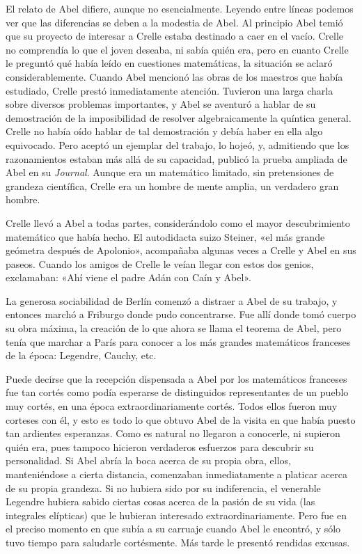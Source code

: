 \documentclass[a4paper, 12pt, draft]{article}
\begin{document}
El relato de Abel difiere, aunque no esencialmente. Leyendo entre líneas podemos ver que las diferencias se deben a la modestia de Abel. Al principio Abel temió que su proyecto de interesar a Crelle estaba destinado a caer en el vacío. Crelle no comprendía lo que el joven deseaba, ni sabía quién era, pero en cuanto Crelle le preguntó qué había leído en cuestiones matemáticas, la situación se aclaró considerablemente. Cuando Abel mencionó las obras de los maestros que había estudiado, Crelle prestó inmediatamente atención. Tuvieron una larga charla sobre diversos problemas importantes, y Abel se aventuró a hablar de su demostración de la imposibilidad de resolver algebraicamente la quíntica general. Crelle no había oído hablar de tal demostración y debía haber en ella algo equivocado. Pero aceptó un ejemplar del trabajo, lo hojeó, y, admitiendo que los razonamientos estaban más allá de su capacidad, publicó la prueba ampliada de Abel en su {\it Journal}. Aunque era un matemático limitado, sin pretensiones de grandeza científica, Crelle era un hombre de mente amplia, un verdadero gran hombre.

Crelle llevó a Abel a todas partes, considerándolo como el mayor descubrimiento matemático que había hecho. El autodidacta suizo Steiner, «el más grande geómetra después de Apolonio», acompañaba algunas veces a Crelle y Abel en sus paseos. Cuando los amigos de Crelle le veían llegar con estos dos genios, exclamaban: «Ahí viene el padre Adán con Caín y Abel».

La generosa sociabilidad de Berlín comenzó a distraer a Abel de su trabajo, y entonces marchó a Friburgo donde pudo concentrarse. Fue allí donde tomó cuerpo su obra máxima, la creación de lo que ahora se llama el teorema de Abel, pero tenía que marchar a París para conocer a los más grandes matemáticos franceses de la época: Legendre, Cauchy, etc.

Puede decirse que la recepción dispensada a Abel por los matemáticos franceses fue tan cortés como podía esperarse de distinguidos representantes de un pueblo muy cortés, en una época extraordinariamente cortés. Todos ellos fueron muy corteses con él, y esto es todo lo que obtuvo Abel de la visita en que había puesto tan ardientes esperanzas. Como es natural no llegaron a conocerle, ni supieron quién era, pues tampoco hicieron verdaderos esfuerzos para descubrir su personalidad. Si Abel abría la boca acerca de su propia obra, ellos, manteniéndose a cierta distancia, comenzaban inmediatamente a platicar acerca de su propia grandeza. Si no hubiera sido por su indiferencia, el venerable Legendre hubiera sabido ciertas cosas acerca de la pasión de su vida (las integrales elípticas) que le hubieran interesado extraordinariamente. Pero fue en el preciso momento en que subía a su carruaje cuando Abel le encontró, y sólo tuvo tiempo para saludarle cortésmente. Más tarde le presentó rendidas excusas.
\end{document}
